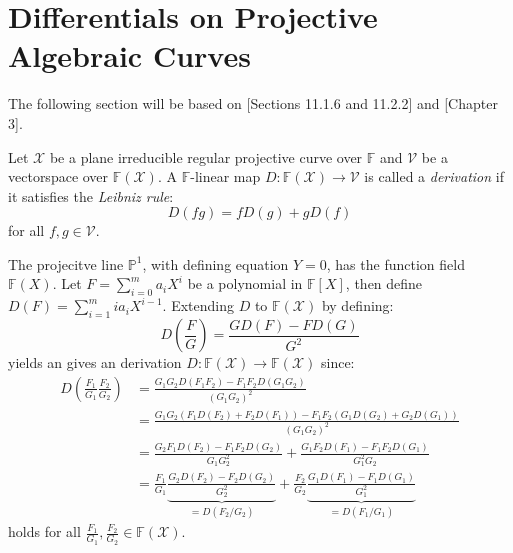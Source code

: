 \section{Differentials on Projective Algebraic Curves}%
The following section will be based on \cite{CCC_with_CA}[Sections 11.1.6 and 11.2.2] and \cite{AG_codes_and_applications}[Chapter 3].

\begin{definition}
  Let $\mathcal{X}$ be a plane irreducible regular projective curve over $\mathbb{F}$ and $\mathcal{V}$ be a vectorspace over $\mathbb{F}(\mathcal{X})$. A $\mathbb{F}$-linear map $D: \mathbb{F}(\mathcal{X}) \to \mathcal{V}$ is called a \textit{derivation} if it satisfies the \textit{Leibniz rule}:
  \begin{equation*}
    D(fg) = fD(g) + gD(f)
  \end{equation*}
  for all $f, g \in \mathcal{V}$.
\end{definition}
\begin{example}\label{exmp:}
  The projecitve line $\mathbb{P}^1$, with defining equation $Y = 0$, has the function field $\mathbb{F}(X)$. Let $F = \sum_{i = 0}^{m} a_i X^i$ be a polynomial in $\mathbb{F}[X]$, then define $D(F) = \sum_{i = 1}^m i a_i X^{i - 1}$. Extending $D$ to $\mathbb{F}(\mathcal{X})$ by defining:
  \begin{equation*}
    D \left(\frac{F}{G}\right) = \frac{G D(F) - F D(G)}{G^{2}} %
  \end{equation*}
  yields an gives an derivation $D: \mathbb{F}(\mathcal{X}) \to \mathbb{F}(\mathcal{X})$ since:
  \begin{align*}
    D \left(\frac{F_{1}}{G_{1}} \frac{F_{2}}{G_{2}}\right) &= \frac{G_1G_2 D(F_1F_2) - F_1F_2 D(G_1G_2)}{(G_1G_2)^{2}}\\ &= \frac{G_1G_2 (F_1D(F_2) + F_2D(F_1)) - F_1F_2 (G_1 D(G_2) + G_2 D(G_1))}{(G_1G_2)^{2}} \\ %
                                                           &= \frac{G_2 F_1 D(F_2) - F_1F_2 D(G_2)}{G_{1}G_2^2} + \frac{G_{1} F_2 D(F_1) - F_1F_2D(G_1)}{G_1^{2}G_{2}} \\
    &= \frac{F_1}{G_1} \underset{=D \left(F_2 / G_2\right)}{\underbrace{\frac{G_2D(F_2) - F_2D(G_2)}{G_2^2}}} + \frac{F_{2}}{G_{2}} \underset{=D \left(F_1 / G_1\right)}{\underbrace{\frac{G_1D(F_1) - F_1D(G_1)}{G_1^{2}}}}
  \end{align*}
  holds for all $\frac{F_{1}}{G_{1}}, \frac{F_{2}}{G_{2}} \in \mathbb{F}(\mathcal{X})$.
\end{example}
